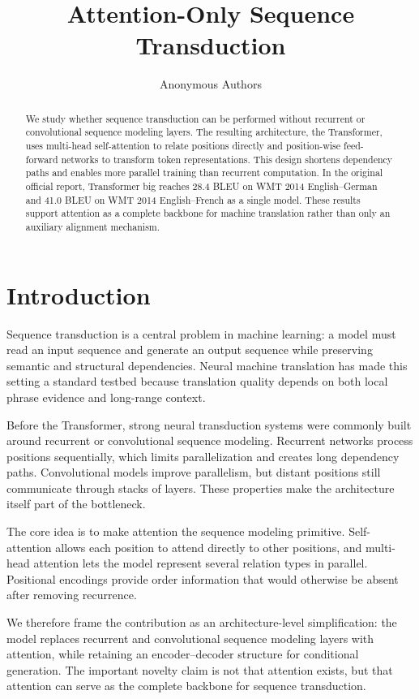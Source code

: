 \documentclass{article}
\title{Attention-Only Sequence Transduction}
\author{Anonymous Authors}
\begin{document}
\maketitle

\begin{abstract}
We study whether sequence transduction can be performed without recurrent or convolutional sequence modeling layers. The resulting architecture, the Transformer, uses multi-head self-attention to relate positions directly and position-wise feed-forward networks to transform token representations. This design shortens dependency paths and enables more parallel training than recurrent computation. In the original official report, Transformer big reaches 28.4 BLEU on WMT 2014 English--German and 41.0 BLEU on WMT 2014 English--French as a single model. These results support attention as a complete backbone for machine translation rather than only an auxiliary alignment mechanism.
\end{abstract}

\section{Introduction}

Sequence transduction is a central problem in machine learning: a model must read an input sequence and generate an output sequence while preserving semantic and structural dependencies. Neural machine translation has made this setting a standard testbed because translation quality depends on both local phrase evidence and long-range context.

Before the Transformer, strong neural transduction systems were commonly built around recurrent or convolutional sequence modeling. Recurrent networks process positions sequentially, which limits parallelization and creates long dependency paths. Convolutional models improve parallelism, but distant positions still communicate through stacks of layers. These properties make the architecture itself part of the bottleneck.

The core idea is to make attention the sequence modeling primitive. Self-attention allows each position to attend directly to other positions, and multi-head attention lets the model represent several relation types in parallel. Positional encodings provide order information that would otherwise be absent after removing recurrence.

We therefore frame the contribution as an architecture-level simplification: the model replaces recurrent and convolutional sequence modeling layers with attention, while retaining an encoder--decoder structure for conditional generation. The important novelty claim is not that attention exists, but that attention can serve as the complete backbone for sequence transduction.
\end{document}
